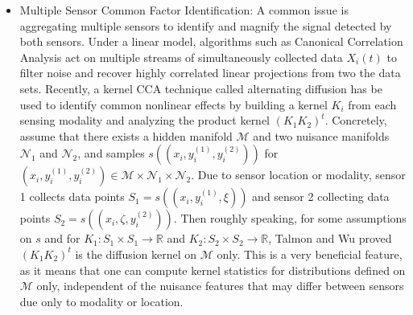 \begin{itemize}
\item Multiple Sensor Common Factor Identification: A common issue is aggregating multiple sensors to identify and magnify the signal detected by both sensors.  Under a linear model, algorithms such as Canonical Correlation Analysis \cite{} act on multiple streams of simultaneously collected data $X_i(t)$ to filter noise and recover highly correlated linear projections from two the data sets.
Recently, a kernel CCA technique called alternating diffusion \cite{Talmon Lederman} has be used to identify common nonlinear effects by building a kernel $K_i$ from each sensing modality and analyzing the product kernel $(K_1 K_2)^t$.   Concretely, assume that there exists a hidden manifold $\mathcal{M}$ and two nuisance manifolds $\mathcal{N}_1$ and $\mathcal{N}_2$, and samples $s((x_i,y_i^{(1)}, y_i^{(2)}))$ for $(x_i,y_i^{(1)}, y_i^{(2)})\in \mathcal{M}\times \mathcal{N}_1\times \mathcal{N}_2$.  Due to sensor location or modality, sensor 1 collects data points $S_1 = s((x_i,y_i^{(1)}, \xi))$ and sensor 2 collecting data points $S_2 = s((x_i,\zeta,y_i^{(2)}))$.  Then roughly speaking, for some assumptions on $s$ and for $K_1: S_1\times S_1 \rightarrow \mathbb{R}$ and $K_2:S_2\times S_2 \rightarrow \mathbb{R}$, Talmon and Wu \cite{Talmon Wu} proved $(K_1 K_2)^t$ is the diffusion kernel on $\mathcal{M}$ only.   This is a very beneficial feature, as it means that one can compute kernel statistics for distributions defined on $\mathcal{M}$ only, independent of the nuisance features that may differ between sensors due only to modality or location.



\end{itemize}
